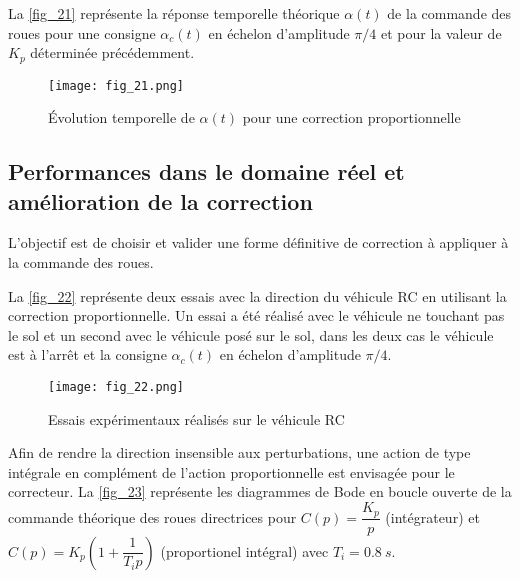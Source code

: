 
La \autoref{fig_21} représente la réponse temporelle théorique $\alpha(t)$ de la commande des roues pour une consigne $\alpha_c(t)$ en échelon d’amplitude $\pi/4$ et pour la valeur de $K_p$ déterminée précédemment.


\begin{figure}[H]
\centering
\texttt{[image: fig\_21.png]}
\caption{Évolution temporelle de $\alpha(t)$ pour une correction proportionnelle \label{fig_21}}
\end{figure}


\subsection{Performances dans le domaine réel et amélioration de la correction}

\begin{obj}
L’objectif est de choisir et valider une forme définitive de correction à appliquer à la commande des
roues.
\end{obj}

La \autoref{fig_22} représente deux essais avec la direction du véhicule RC en utilisant la correction proportionnelle.
Un essai a été réalisé avec le véhicule ne touchant pas le sol et un second avec le véhicule posé sur le sol, dans
les deux cas le véhicule est à l’arrêt et la consigne $\alpha_c(t)$ en échelon d’amplitude $\pi/4$.

\begin{figure}[H]
\centering
\texttt{[image: fig\_22.png]}
\caption{Essais expérimentaux réalisés sur le véhicule RC \label{fig_22}}
\end{figure}


Afin de rendre la direction insensible aux perturbations, une action de type intégrale en complément de l’action
proportionnelle est envisagée pour le correcteur. La \autoref{fig_23} représente les diagrammes de Bode en boucle ouverte de la commande théorique des roues directrices pour $C(p)=\dfrac{K_p}{p}$ 
(intégrateur) et $C(p)=K_p\left(1+\dfrac{1}{T_i p}\right)$ (proportionel intégral) avec $T_i = \SI{0,8}{s}$.

